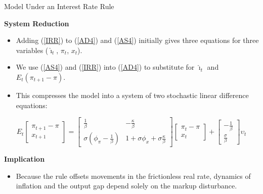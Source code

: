 \documentclass[11pt,aspectratio=169]{beamer}
\begin{document}
\begin{frame}{Model Under an Interest Rate Rule}
\small

\textbf{System Reduction}
\begin{itemize}
    \item Adding (\ref{IRR}) to (\ref{AD4}) and (\ref{AS4}) initially gives three equations for three variables ($\hat{\imath}_{t}$, $\pi _{t}$, $x_{t}$).
    \item We use (\ref{AS4}) and (\ref{IRR}) into (\ref{AD4}) to substitute for $\hat{\imath}_{t}$ and $E_{t}(\pi _{t+1}-\pi )$.
    \item This compresses the model into a system of two stochastic linear difference equations:
\end{itemize}

\begin{equation}
E_{t}\begin{bmatrix}
\pi _{t+1}-\pi \\
x_{t+1}
\end{bmatrix}
=
\begin{bmatrix}
\frac{1}{\beta } & -\frac{\kappa }{\beta } \\
\sigma (\phi _{\pi }-\frac{1}{\beta }) & 1+\sigma \phi _{x}+\sigma \frac{\kappa }{\beta }
\end{bmatrix}
\begin{bmatrix}
\pi _{t}-\pi \\
x_{t}
\end{bmatrix}
+
\begin{bmatrix}
-\frac{1}{\beta } \\
\frac{\sigma }{\beta }
\end{bmatrix}
\upsilon _{t}
\label{System}
\end{equation}

\textbf{Implication}
\begin{itemize}
    \item Because the rule offsets movements in the frictionless real rate, dynamics of inflation and the output gap depend solely on the markup disturbance.
\end{itemize}

\end{frame}
\end{document}
